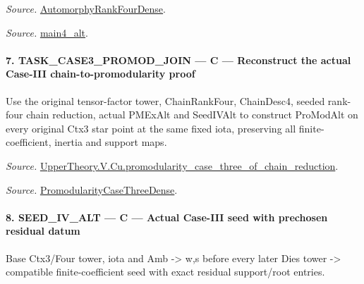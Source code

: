 \documentclass[11pt,a4paper]{article}
\numberwithin{equation}{section}
\theoremstyle{remark}\newtheorem{remark}[theorem]{Remark}
\begin{document}
\emph{Source.} \href{https://github.com/CocoSgt/riemann-hypothesis-lean/blob/7cbf7a0c32fca1badf05931879a37c3f8a2b03b4/src/Development/AutomorphicArithmetic/AutomorphicVarieties/ModularityArgument/ThresholdArguments/DenseThresholdCases/PromodularityCaseThree.lean#L43-L44}{AutomorphyRankFourDense}.

\emph{Source.} \href{https://github.com/CocoSgt/riemann-hypothesis-lean/blob/7cbf7a0c32fca1badf05931879a37c3f8a2b03b4/src/Development/AutomorphicArithmetic/AutomorphicVarieties/ModularityArgument/ThresholdArguments/DenseThresholdCases/CuFinal.lean#L44-L44}{main4\_\allowbreak alt}.



\paragraph{7. TASK\_\allowbreak CASE3\_\allowbreak PROMOD\_\allowbreak JOIN — C — Reconstruct the actual Case-III chain-to-promodularity proof}

Use the original tensor-factor tower, ChainRankFour, ChainDesc4, seeded rank-four chain reduction, actual PMExAlt and SeedIVAlt to construct ProModAlt on every original Ctx3 star point at the same fixed iota, preserving all finite-coefficient, inertia and support maps.

\emph{Source.} \href{https://github.com/CocoSgt/riemann-hypothesis-lean/blob/7cbf7a0c32fca1badf05931879a37c3f8a2b03b4/src/Development/AutomorphicArithmetic/AutomorphicVarieties/ModularityArgument/ThresholdArguments/DenseThresholdCases/PromodularityCaseThreeOfLemmas.lean#L131-L153}{UpperTheory.V.Cu.promodularity\_\allowbreak case\_\allowbreak three\_\allowbreak of\_\allowbreak chain\_\allowbreak reduction}.

\emph{Source.} \href{https://github.com/CocoSgt/riemann-hypothesis-lean/blob/7cbf7a0c32fca1badf05931879a37c3f8a2b03b4/src/Development/AutomorphicArithmetic/AutomorphicVarieties/ModularityArgument/ThresholdArguments/DenseThresholdCases/PromodularityCaseThree.lean#L40-L42}{PromodularityCaseThreeDense}.



\paragraph{8. SEED\_\allowbreak IV\_\allowbreak ALT — C — Actual Case-III seed with prechosen residual datum}

Base Ctx3/Four tower, iota and Amb -> w,s before every later Dies tower -> compatible finite-coefficient seed with exact residual support/root entries.
\end{document}
